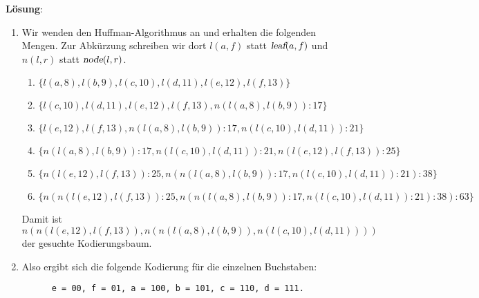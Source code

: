 \documentclass{article}
\begin{document}
\noindent
\textbf{L\"osung}:
\begin{enumerate}
\item Wir wenden den Huffman-Algorithmus an und erhalten die folgenden Mengen.  Zur Abk\"urzung
      schreiben wir dort $l(a,f)$ statt $\textsl{leaf}(a,f)$ und $n(l,r)$ statt $\textsl{node}(l,r)$.
      \begin{enumerate}
      \item $\{ l(a,8), l(b,9), l(c,10), l(d,11), l(e,12), l(f,13) \}$
      \item $\{ l(c,10), l(d,11), l(e,12), l(f,13), n(l(a,8), l(b,9)):17 \}$
      \item $\{ l(e,12), l(f,13), n(l(a,8), l(b,9)):17, n(l(c,10), l(d,11)):21 \}$
      \item $\{ n(l(a,8), l(b,9)):17, n(l(c,10), l(d,11)):21, n(l(e,12), l(f,13)):25 \}$
      \item $\{ n(l(e,12), l(f,13)):25, n(n(l(a,8), l(b,9)):17, n(l(c,10), l(d,11)) :21):38 \}$
      \item $\{ n(n(l(e,12), l(f,13)):25, n(n(l(a,8), l(b,9)):17, n(l(c,10), l(d,11)):21):38):63 \}$
      \end{enumerate}
      Damit ist 
      \\[0.2cm]
      \hspace*{1.3cm} $n(n(l(e,12), l(f,13)), n(n(l(a,8), l(b,9)), n(l(c,10), l(d,11))))$
      \\[0.2cm]
      der gesuchte Kodierungsbaum.
\item Also ergibt sich die folgende Kodierung f\"ur die einzelnen Buchstaben:
      \begin{verbatim}
      e = 00, f = 01, a = 100, b = 101, c = 110, d = 111.
      \end{verbatim}
\end{enumerate}
\end{document}
